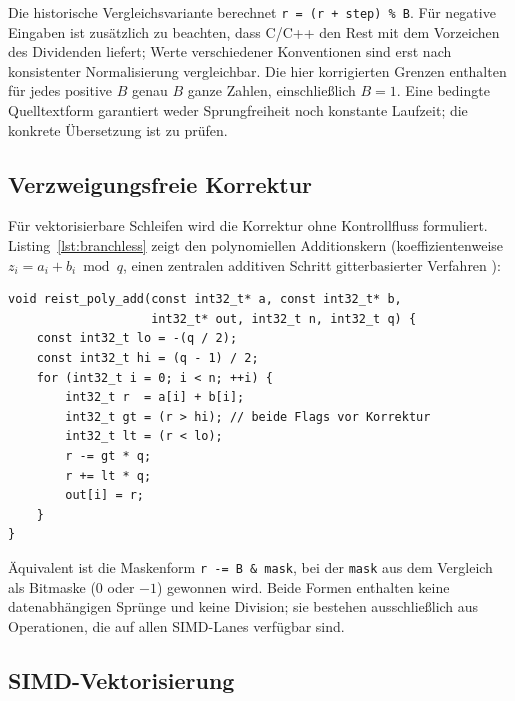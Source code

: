 \documentclass[11pt,a4paper]{scrartcl}
\theoremstyle{definition}
\theoremstyle{plain}
\theoremstyle{remark}
\begin{document}
Die historische Vergleichsvariante berechnet \texttt{r = (r + step) \% B}. Für negative Eingaben ist zusätzlich zu beachten, dass C/C++ den Rest mit dem Vorzeichen des Dividenden liefert; Werte verschiedener Konventionen sind erst nach konsistenter Normalisierung vergleichbar. Die hier korrigierten Grenzen enthalten für jedes positive $B$ genau $B$ ganze Zahlen, einschließlich $B=1$. Eine bedingte Quelltextform garantiert weder Sprungfreiheit noch konstante Laufzeit; die konkrete Übersetzung ist zu prüfen.

\subsection{Verzweigungsfreie Korrektur}

Für vektorisierbare Schleifen wird die Korrektur ohne Kontrollfluss formuliert. Listing~\ref{lst:branchless} zeigt den polynomiellen Additionskern (koeffizientenweise $z_i = a_i + b_i \bmod q$, einen zentralen additiven Schritt gitterbasierter Verfahren \cite{kyber,dilithium}):

\noindent\begin{minipage}{\linewidth}
\begin{lstlisting}[caption={Korrigierte polynomielle Referenzform für zentrierte Eingangskoeffizienten und positiven 32-Bit-Modul. Die Vergleiche liefern 0/1-Flags; die Korrektur erfolgt arithmetisch ohne Sprünge.},label={lst:branchless}]
void reist_poly_add(const int32_t* a, const int32_t* b,
                    int32_t* out, int32_t n, int32_t q) {
    const int32_t lo = -(q / 2);
    const int32_t hi = (q - 1) / 2;
    for (int32_t i = 0; i < n; ++i) {
        int32_t r  = a[i] + b[i];
        int32_t gt = (r > hi); // beide Flags vor Korrektur
        int32_t lt = (r < lo);
        r -= gt * q;
        r += lt * q;
        out[i] = r;
    }
}
\end{lstlisting}
\end{minipage}

Äquivalent ist die Maskenform \texttt{r -= B \& mask}, bei der \texttt{mask} aus dem Vergleich als Bitmaske (0 oder $-1$) gewonnen wird. Beide Formen enthalten keine datenabhängigen Sprünge und keine Division; sie bestehen ausschließlich aus Operationen, die auf allen SIMD-Lanes verfügbar sind.

\subsection{SIMD-Vektorisierung}
\end{document}

